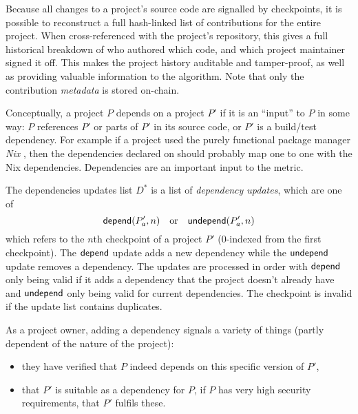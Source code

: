 Because all changes to a project's source code are signalled by checkpoints, it
is possible to reconstruct a full hash-linked list of contributions for the
entire project. When cross-referenced with the project's repository, this gives
a full historical breakdown of who authored which code, and which project
maintainer signed it off.  This makes the project history auditable and
tamper-proof, as well as providing valuable information to the \osrank{}
algorithm. Note that only the contribution \emph{metadata} is stored on-chain.

\label{s:dependencies}
Conceptually, a project $P$ depends on a project $P'$ if it is an
``input'' to $P$ in some way: $P$ references $P'$ or parts of
$P'$ in its source code, or $P'$ is a build/test dependency.
For example if a project used the purely functional package
manager \emph{Nix} \cite{nix}, then the dependencies declared on
\oscoin{} should probably map one to one with the Nix
dependencies. Dependencies are an important input to the \osrank{}
metric.

The dependencies updates list $D^*$ is a list of \emph{dependency
  updates}, which are one of
\[
    \mathsf{depend}(P'_a, n) \quad \text{or} \quad \mathsf{undepend}(P'_a, n)
\]
which refers to the $n$th checkpoint of a project $P'$ ($0$-indexed
from the first checkpoint). The $\mathsf{depend}$ update adds a new dependency
while the $\mathsf{undepend}$ update removes a dependency. The updates are
processed in order with $\mathsf{depend}$ only being valid if it adds a
dependency that the project doesn't already have and $\mathsf{undepend}$
only being valid for current dependencies. The checkpoint is invalid
if the update list contains duplicates.

As a project owner, adding a dependency signals a variety of things
(partly dependent of the nature of the project):
\begin{itemize}
\item they have verified that $P$ indeed depends on this specific
  version of $P'$,
\item that $P'$ is suitable as a dependency for $P$, \eg{} if $P$ has
  very high security requirements, that $P'$ fulfils these.
\end{itemize}


